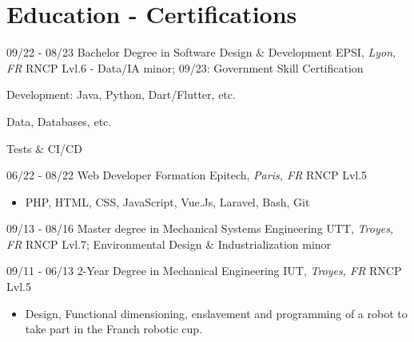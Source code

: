 \documentclass[]{friggeri-cv}
\begin{document}
\vspace*{-0.5cm}
\vspace*{0.45cm}
\section{Education - Certifications}
\vspace*{-0.25cm}
\vspace{0.5mm}
\begin{entrylist}
  \entry
    {09/22 - 08/23}
    {Bachelor Degree in Software Design \& Development}
    {EPSI, \textit{Lyon, FR}}
    {RNCP Lvl.6 - Data/IA minor; \hspace{7mm} 09/23: Government Skill Certification}
\end{entrylist}
\vspace*{-0.65cm}
\begin{itemize}
\setlength{\itemsep}{1pt}
\setlength{\parskip}{0pt}
\setlength{\parsep}{0pt}
\begin{multicols}{2}
\item Development: \newline Java, Python, Dart/Flutter, etc.
\columnbreak
\item Data, Databases, etc.
\item Tests \& CI/CD
\end{multicols}
\end{itemize}\vspace{0.5mm}
\begin{entrylist}
  \entry
    {06/22 - 08/22}
    {Web Developer Formation}
    {Epitech, \textit{Paris, FR}}
    {RNCP Lvl.5}
\end{entrylist}

\vspace*{-0.35cm}
\begin{itemize}
\setlength{\itemsep}{1pt}
\setlength{\parskip}{0pt}
\setlength{\parsep}{0pt}

\item PHP, HTML, CSS, JavaScript, Vue.Js, Laravel, Bash, Git
\end{itemize}\vspace{0.5mm}
\begin{entrylist}
  \entry
    {09/13 - 08/16}
    {Master degree in Mechanical Systems Engineering}
    {UTT, \textit{Troyes, FR}}
    {RNCP Lvl.7; Environmental Design \& Industrialization minor}
\end{entrylist}
\vspace{0.5mm}
\begin{entrylist}
  \entry
    {09/11 - 06/13}
    {2-Year Degree in Mechanical Engineering}
    {IUT, \textit{Troyes, FR}}
    {RNCP Lvl.5}
\end{entrylist}
\vspace*{-0.4cm}
\begin{itemize}
\setlength{\itemsep}{1pt}
\setlength{\parskip}{0pt}
\setlength{\parsep}{0pt}
\item Design, Functional dimensioning, enslavement and programming of a robot to take part in the Franch robotic cup.
\end{itemize}
\end{document}
